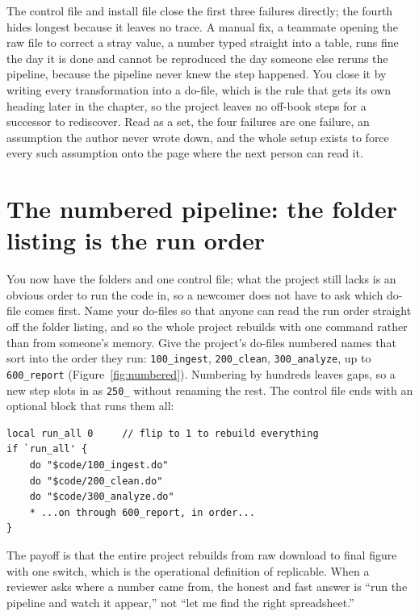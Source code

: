\documentclass[
    a4paper,
    fontsize=10pt,
    twoside=true,
    numbers=noenddot,
]{kaobook}
\begin{document}
The control file and install file close the first three failures directly; the fourth hides longest because it leaves no trace. A manual fix, a teammate opening the raw file to correct a stray value, a number typed straight into a table, runs fine the day it is done and cannot be reproduced the day someone else reruns the pipeline, because the pipeline never knew the step happened. You close it by writing every transformation into a do-file, which is the rule that gets its own heading later in the chapter, so the project leaves no off-book steps for a successor to rediscover. Read as a set, the four failures are one failure, an assumption the author never wrote down, and the whole setup exists to force every such assumption onto the page where the next person can read it.

\section{The numbered pipeline: the folder listing is the run order}\label{sec:numbered}
You now have the folders and one control file; what the project still lacks is an obvious order to run the code in, so a newcomer does not have to ask which do-file comes first. Name your do-files so that anyone can read the run order straight off the folder listing, and so the whole project rebuilds with one command rather than from someone's memory. Give the project's do-files numbered names that sort into the order they run: \texttt{100\_ingest}, \texttt{200\_clean}, \texttt{300\_analyze}, up to \texttt{600\_report} (Figure~\ref{fig:numbered}). Numbering by hundreds leaves gaps, so a new step slots in as \texttt{250\_} without renaming the rest. The control file ends with an optional block that runs them all:
\par
{\footnotesize
\begin{verbatim}
local run_all 0     // flip to 1 to rebuild everything
if `run_all' {
    do "$code/100_ingest.do"
    do "$code/200_clean.do"
    do "$code/300_analyze.do"
    * ...on through 600_report, in order...
}
\end{verbatim}
}
The payoff is that the entire project rebuilds from raw download to final figure with one switch, which is the operational definition of replicable. When a reviewer asks where a number came from, the honest and fast answer is \enquote{run the pipeline and watch it appear,} not \enquote{let me find the right spreadsheet.}
\end{document}
